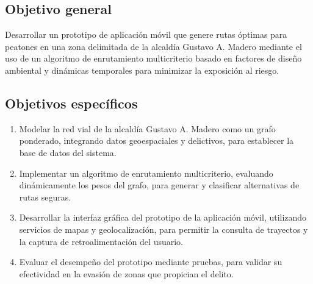 
\subsection{Objetivo general}
\label{subsec:objetivo_general}

Desarrollar un prototipo de aplicación móvil que genere rutas óptimas para peatones en una zona delimitada de la alcaldía Gustavo A. Madero mediante el uso de un algoritmo de enrutamiento multicriterio basado en factores de diseño ambiental y dinámicas temporales para minimizar la exposición al riesgo. 

\subsection{Objetivos específicos}
\label{subsec:objetivos_especificos}

\begin{enumerate}
    \item Modelar la red vial de la alcaldía Gustavo A. Madero como un grafo ponderado, integrando datos geoespaciales y delictivos, para establecer la base de datos del sistema.
    \item Implementar un algoritmo de enrutamiento multicriterio, evaluando dinámicamente los pesos del grafo, para generar y clasificar alternativas de rutas seguras.
    \item Desarrollar la interfaz gráfica del prototipo de la aplicación móvil, utilizando servicios de mapas y geolocalización, para permitir la consulta de trayectos y la captura de retroalimentación del usuario.
    \item Evaluar el desempeño del prototipo mediante pruebas, para validar su efectividad en la evasión de zonas que propician el delito.
\end{enumerate}
